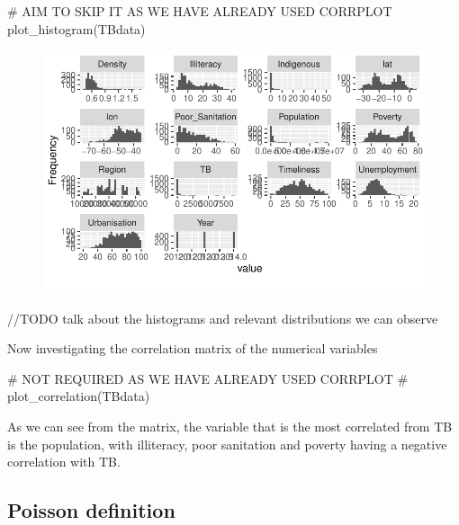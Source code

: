 \documentclass[
  letterpaper,
  DIV=11,
  numbers=noendperiod]{scrartcl}
\newenvironment{Shaded}{\begin{snugshade}}{\end{snugshade}}
\newcommand{\CommentTok}[1]{\textcolor[rgb]{0.37,0.37,0.37}{#1}}
\newcommand{\FunctionTok}[1]{\textcolor[rgb]{0.28,0.35,0.67}{#1}}
\newcommand{\NormalTok}[1]{\textcolor[rgb]{0.00,0.23,0.31}{#1}}
\begin{document}
\begin{Shaded}
\begin{Highlighting}[]
\CommentTok{\# AIM TO SKIP IT AS WE HAVE ALREADY USED CORRPLOT}
\FunctionTok{plot\_histogram}\NormalTok{(TBdata)}
\end{Highlighting}
\end{Shaded}

\begin{figure}[H]

{\centering \includegraphics{Group34Coursework_files/figure-pdf/unnamed-chunk-6-1.pdf}

}

\end{figure}

//TODO talk about the histograms and relevant distributions we can
observe

Now investigating the correlation matrix of the numerical variables

\begin{Shaded}
\begin{Highlighting}[]
\CommentTok{\# NOT REQUIRED AS WE HAVE ALREADY USED CORRPLOT}
\CommentTok{\# plot\_correlation(TBdata)}
\end{Highlighting}
\end{Shaded}

As we can see from the matrix, the variable that is the most correlated
from TB is the population, with illiteracy, poor sanitation and poverty
having a negative correlation with TB.

\hypertarget{poisson-definition}{%
\subsection{Poisson definition}\label{poisson-definition}}
\end{document}
